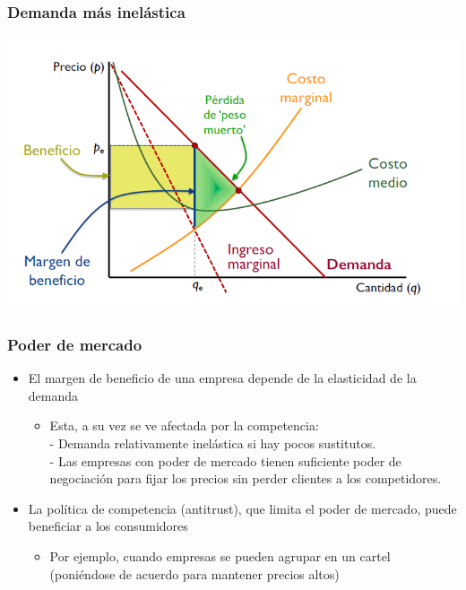 \documentclass{beamer}
\begin{document}
\begin{frame}
\frametitle{Demanda más inelástica}
\includegraphics[scale=0.6]{../Figures/Tema_06.48_elasticidad4.png}
\end{frame}

\begin{frame}
\frametitle{Poder de mercado}
\begin{itemize}
    \item El margen de beneficio de una empresa depende de la elasticidad de la demanda\vspace{2mm}
    \begin{itemize}
        \item Esta, a su vez se ve afectada por la competencia: \\
        - Demanda relativamente inelástica si hay pocos sustitutos. \\
        - Las empresas con poder de mercado tienen suficiente poder de negociación para fijar los precios sin perder clientes a los competidores.\vspace{4mm}
    \end{itemize}
    \item La política de competencia (antitrust), que limita el poder de mercado, puede beneficiar a los consumidores\vspace{2mm}
    \begin{itemize}
        \item Por ejemplo, cuando empresas se pueden agrupar en un cartel (poniéndose de acuerdo para mantener precios altos)
    \end{itemize}
\end{itemize}
\end{frame}
\end{document}
